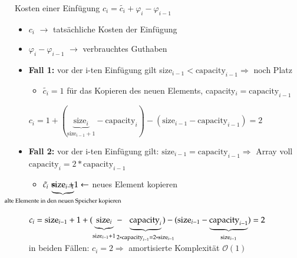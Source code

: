 \documentclass[11pt, fleqn]{scrreprt}
\newcommand{\bigO}[0]{\mathcal{O}}
\begin{document}
Kosten einer Einfügung $c_i = \tilde{c_i} + \varphi_i - \varphi_{i-1}$\\
\begin{itemize}
    \item $c_i$ $\rightarrow$ tatsächliche Kosten der Einfügung
    \item $ \varphi_i - \varphi_{i-1}$ $\rightarrow$ verbrauchtes Guthaben
\end{itemize}

\begin{itemize}
    \item \textbf{Fall 1:} vor der i-ten Einfügung gilt size$_{i-1} < \text{capacity}_{i-1} \Rightarrow$ noch Platz
    \begin{itemize}[label={$\Rightarrow$}]
        \item $\tilde{c_i} = 1$ für das Kopieren des neuen Elements, capacity$_i = \text{capacity}_{i-1}$
    \end{itemize}
    $c_i = 1 + (\underbrace{\text{size}_i}_{\text{size}_{i-1}+1}- \text{capacity}_i) - (\text{size}_{i-1} - \text{capacity}_{i-1}) = 2$

    \item \textbf{Fall 2:} vor der i-ten Einfügung gilt: $\text{size}_{i-1} = \text{capacity}_{i-1} \Rightarrow $ Array voll \\
    \hspace*{7.8cm}  $\text{capacity}_{i} = 2*\text{capacity}_{i-1} $ \\
    \begin{itemize}[label={$\Rightarrow$}]
        \item   $\tilde{c_i} = \hspace*{-2.3cm}\underbrace{\text{size}_{i-1}}_{\text{alte Elemente in den neuen Speicher kopieren}}\hspace*{-2.3cm}+  1 \leftarrow$ neues Element kopieren
    \end{itemize}
    $c_i = \text{size}_{i-1} + 1 + (\underbrace{\text{size}_{i}}_{\text{size}_{i-1}+1} - \hspace*{-0.3cm} \underbrace{\text{capacity}_{i}}_{2*\text{capacity}_{i-1} = 2* \text{size}_{i-1}}\hspace*{-0.5cm}) - (\text{size}_{i-1} -\underbrace{ \text{capacity}_{i-1}}_{\text{size}_{i-1}}) = 2$ \\

    in beiden Fällen: $c_i = 2 \Rightarrow$ amortisierte Komplexität $\bigO{}(1)$
\end{itemize}
\end{document}

